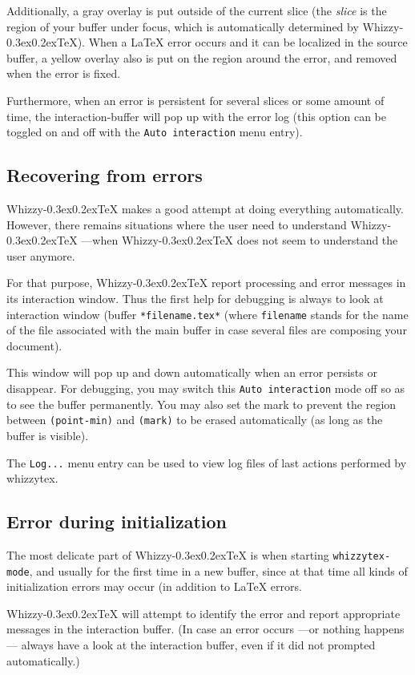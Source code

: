 \documentclass[12pt]{article}
\makeatletter
\let \lst \verb
\def \whizzy {{Whizzy\kern -0.3ex\raise 0.2ex\hbox{\let \@\relax\TeX}}}
\makeatother
\begin{document}
Additionally, a gray overlay is put outside of the current slice (the {\em
slice} is the region of your buffer under focus, which is automatically
determined by {\whizzy}). When a {\LaTeX} error occurs and it can be
localized in the source buffer, a yellow overlay also is put on the region
around the error, and removed when the error is fixed.

Furthermore, when an error is persistent for several slices or some amount
of time, the interaction-buffer will pop up with the error log
(this option can be toggled on and off with the {\tt Auto interaction} menu
entry).  

\subsection {Recovering from errors}

{\whizzy} makes a good attempt at doing everything automatically. 
However, there remains situations where the user need to understand 
{\whizzy} ---when {\whizzy} does not seem to understand the user anymore. 

For that purpose, {\whizzy} report processing and error messages
in its interaction window. Thus the first help for debugging
is always to look at interaction window (buffer 
\lst"*filename.tex*" (where \lst"filename" stands for the name of the file
associated with the main buffer in case several files are composing your
document). 

This window will pop up and down automatically when an error persists or
disappear. For debugging, you may switch this {\tt Auto interaction} mode
off so as to see the buffer permanently. You may also set the mark 
to prevent the region between \lst"(point-min)" and \lst"(mark)" to be
erased automatically (as long as the buffer is visible). 

The {\tt Log...} menu entry can be used to view log files of
last actions performed by whizzytex. 

\subsection {Error during initialization}

The most delicate part of {\whizzy} is when starting {\tt whizzytex-mode},
and usually for the first time in a new buffer, since at that time all kinds
of initialization errors may occur (in addition to {\LaTeX} errors. 

{\whizzy} will attempt to identify the error and report appropriate messages
in the interaction buffer. (In case an error occurs ---or nothing happens---
always have a look at the interaction buffer, even if it did not prompted
automatically.)
\end{document}
